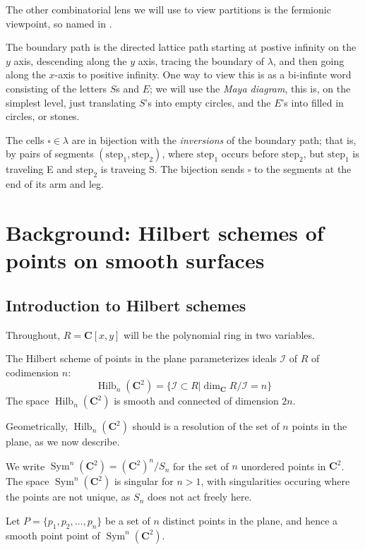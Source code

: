\documentclass{amsart}[12pt]
\theoremstyle{definition}
\newcommand{\C}{\mathbf{C}}
\DeclareMathOperator{\Hilb}{Hilb}
\DeclareMathOperator{\Sym}{Sym}
\begin{document}
The other combinatorial lens we will use to view partitions is the fermionic viewpoint, so named in .  

The boundary path is the directed lattice path starting at postive infinity on the $y$ axis, descending along the $y$ axis, tracing the boundary of $\lambda$, and then going along the $x$-axis to positive infinity.  One way to view this is as a bi-infinte word consisting of the letters $S$s and $E$; we will use the \emph{Maya diagram}, this is, on the simplest level, just translating $S$'s into empty circles, and the $E$'s into filled in circles, or stones.  



The cells $\square\in\lambda$ are in bijection with the
\emph{inversions} of the boundary path; that is, by pairs of segments
$(\text{step}_1, \text{step}_2)$, where $\text{step}_1$ occurs before $\text{step}_2$, but $\text{step}_1$ is traveling E and $\text{step}_2$ is traveing S.  The bijection sends $\square$ to the segments at the end of its arm and leg.





\section{Background: Hilbert schemes of points on smooth surfaces}
\label{sec:smoothbackground}



\subsection{Introduction to Hilbert schemes}

Throughout, $R=\C[x,y]$ will be the polynomial ring in two variables.  

The Hilbert scheme of points in the plane parameterizes ideals $\mathcal{I}$ of $R$ of codimension $n$:
$$\Hilb_n(\C^2)=\{\mathcal{I}\subset R | \dim_\C R/\mathcal{I}=n\}$$
The space $\Hilb_n(\C^2)$ is smooth and connected of dimension $2n$.

Geometrically, $\Hilb_n(\C^2)$ should is a resolution of the set of $n$ points in the plane, as we now describe.

 We write $\Sym^n(\C^2)=(\C^2)^n/S_n$ for the set of $n$ unordered points in $\C^2$.  The space $\Sym^n(\C^2)$ is singular for $n>1$, with singularities occuring where the points are not unique, as $S_n$ does not act freely here.  

Let $P=\{p_1,p_2,\dots, p_n\}$ be a set of $n$ distinct points in the plane, and hence a smooth point point of $\Sym^n(\C^2)$.  
\end{document}
